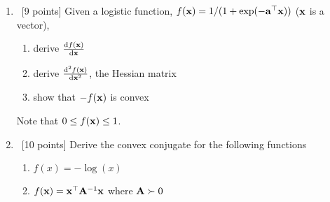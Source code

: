 \documentclass[12pt, fullpage,letterpaper]{article}
\begin{document}
\begin{enumerate}
\item~[9 points] Given a logistic function, $f({\bf x}) = 1/(1+\exp(-{\bf a}^\top {\bf x}))$ (${\bf x}$ is a vector),  
\begin{enumerate}
\item derive $\frac{{\rm d} f({\bf x})}{{\rm d} {\bf x}}$
\item derive $\frac{{\rm d}^2 f({\bf x})}{{\rm d} {\bf x}^2}$, \ie the Hessian matrix
\item show that $-f({\bf x})$ is convex
\end{enumerate}
Note that $0 \le f({\bf x}) \le 1$.

\item ~[10 points] Derive the convex conjugate for the following functions
\begin{enumerate}
\item $f(x) = -\log(x)$
\item $f({\bf x}) = {\bf x}^\top {\bf A}^{-1} {\bf x}$ where ${\bf A} \succ 0$
\end{enumerate}


\end{enumerate}
\end{document}
